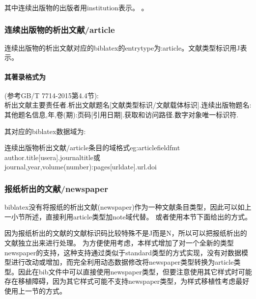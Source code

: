 其中连续出版物的出版者用institution表示。
。

\subsubsection{连续出版物的析出文献/article}
\begin{refentry}{}{}
连续出版物的析出文献对应的biblatex的entrytype为:article。文献类型标识用J表示。

\paragraph{其著录格式为}(参考GB/T 7714-2015第4.4节):\\
析出文献主要责任者.析出文献题名[文献类型标识/文献载体标识].连续出版物题名:其他题名信息,年,卷(期):页码[引用日期].获取和访问路径.数字对象唯一标识符.
\end{refentry}

其对应的biblatex数据域为:
\begin{codetex}{连续出版物析出文献/article条目的域格式}{eg:articlefieldfmt}
author.title[usera].journaltitle或journal,year,volume(number):pages[urldate].url.doi
\end{codetex}


\subsubsection{报纸析出的文献/newspaper}\label{sec:standard}
biblatex没有将报纸的析出文献(newspaper)作为一种文献条目类型，因此可以如上一小节所述，直接利用article类型加note域代替。
或者使用本节下面给出的方式。

因为报纸析出的文献的文献标识码比较特殊不是J而是N，所以可以把报纸析出的文献独立出来进行处理。
为方便使用考虑，本样式增加了对一个全新的类型newspaper的支持，这种支持通过类似于standard类型的方式实现，没有对数据模型进行改动或增加，而完全利用动态数据修改将newspaper类型转换为article类型。因此在bib文件中可以直接使用newspaper类型，但要注意使用其它样式时可能存在移植障碍，因为其它样式可能不支持newspaper类型，为样式移植性考虑最好使用上一节的方式。

